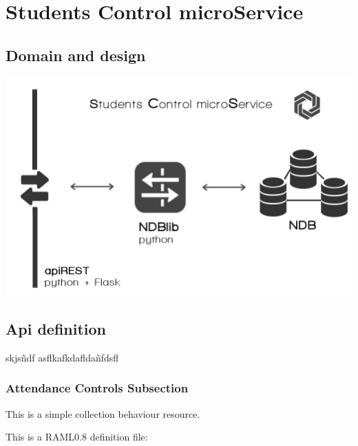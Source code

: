 \section{Students Control microService}

\subsection{Domain and design}

\begin{center}
\includegraphics[scale=0.4]{img/graphics/scms.png}
\end{center}

\subsection{Api definition}

skjsñdf
asflkafkdafldañfdsfl


\subsubsection{Attendance Controls Subsection}

This is a simple collection behaviour resource.

This is a RAML0.8 definition file:

